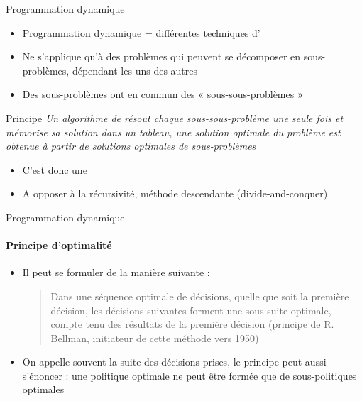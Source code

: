 \documentclass[aspectratio=1610,francais,envcountsect]{beamer}
\begin{document}
\begin{frame}{Programmation dynamique}

  \begin{itemize}
  \item Programmation dynamique = différentes techniques
    d’
  
  \item Ne s’applique qu’à des problèmes qui peuvent se décomposer en
    sous-problèmes, dépendant les uns des autres
  \item Des sous-problèmes ont en commun des « sous-sous-problèmes »
  \end{itemize}
  
  \begin{alertblock}{Principe}
    \it Un algorithme de  résout
    chaque sous-sous-problème une seule fois et mémorise sa solution
    dans un tableau, une solution optimale du problème est obtenue à
    partir de solutions optimales de sous-problèmes
  \end{alertblock}

  \begin{itemize}
  \item C'est donc une 
  \item A opposer à la récursivité, méthode descendante
    (divide-and-conquer)
  \end{itemize}
\end{frame}

\begin{frame}{Programmation dynamique}
  \framesubtitle{Principe d'optimalité}

  \begin{itemize}
  \item Il peut se formuler de la manière suivante :

    \begin{quote}
      Dans une séquence optimale de décisions, quelle que soit la
      première décision, les décisions suivantes forment une
      sous-suite optimale, compte tenu des résultats de la première
      décision (principe de R. Bellman, initiateur de cette méthode
      vers 1950)
    \end{quote}
  \item On appelle souvent  la suite des
    décisions prises, le principe peut aussi s’énoncer : une politique
    optimale ne peut être formée que de sous-politiques optimales
  \end{itemize}
  
\end{frame}
\end{document}
